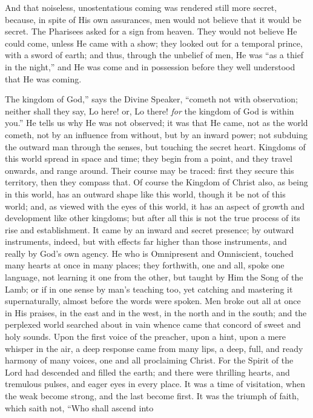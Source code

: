 And that noiseless, unostentatious coming was rendered still more
secret, because, in spite of His own assurances, men would not believe
that it would be secret. The Pharisees asked for a sign from heaven.
They would not believe He could come, unless He came with a show; they
looked out for a temporal prince, with a sword of earth; and thus,
through the unbelief of men, He was ``as a thief in the
night,'' and He was come and in possession before they well
understood that He was coming.

The kingdom of God,'' says the Divine Speaker, ``cometh not with
observation; neither shall they say, Lo here! or, Lo there! \emph{for}
the kingdom of God is within you.'' He tells us why He was not
observed; it was that He came, not as the world cometh, not by an
influence from without, but by an inward power; not subduing the
outward man through the senses, but touching the secret heart.
Kingdoms of this world spread in space and time; they begin from a
point, and they travel onwards, and range around. Their course may be
traced: first they secure this territory, then they compass that. Of
course the Kingdom of Christ also, as being in this world, has an
outward shape like this world, though it be not of this world; and, as
viewed with the eyes of this world, it has an aspect of growth and
development like other kingdoms; but after all this is not the true
process of its rise and establishment. It came by an inward and secret
presence; by outward instruments, indeed, but with effects far higher
than those instruments, and really by God's own agency. He who is
Omnipresent and Omniscient, touched many hearts at once in many
places; they forthwith, one and all, spoke one language, not learning
it one from the other, but taught by Him the Song of the Lamb; or if
in one sense by man's teaching too, yet catching and mastering it
supernaturally, almost before the words were spoken. Men broke out all
at once in His praises, in the east and in the west, in the north and
in the south; and the perplexed world searched about in vain whence
came that concord of sweet and holy sounds. Upon the first voice of
the preacher, upon a hint, upon a mere whisper in the air, a deep
response came from many lips, a deep, full, and ready harmony of many
voices, one and all proclaiming Christ. For the Spirit of the Lord had
descended and filled the earth; and there were thrilling hearts, and
tremulous pulses, and eager eyes in every place. It was a time of
visitation, when the weak become strong, and the last become first. It
was the triumph of faith, which saith not, ``Who shall ascend into
